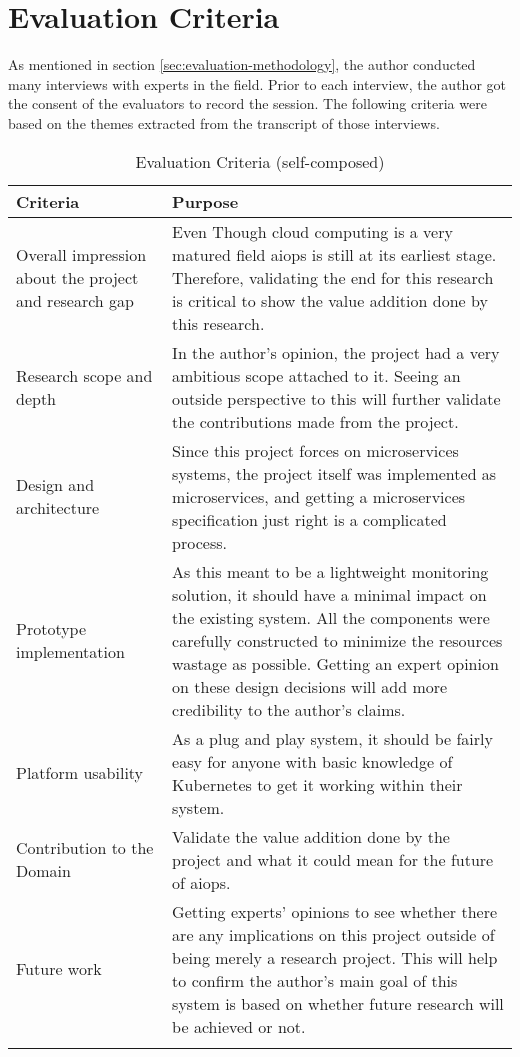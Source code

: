\section{Evaluation Criteria}

As mentioned in section \ref{sec:evaluation-methodology}, the author conducted many interviews with experts in the field. Prior to each interview, the author got the consent of the evaluators to record the session. The following criteria were based on the themes extracted from the transcript of those interviews.

\begin{longtable}{|p{33mm}|p{120mm}|}
    \hline
    \textbf{Criteria} &
    \textbf{Purpose} \\ \hline
    Overall impression about the project and research gap &
        Even Though cloud computing is a very matured field \ac{aiops} is still at its earliest stage. Therefore, validating the end for this research is critical to show the value addition done by this research. \\ \hline
    Research scope and depth &
        In the author's opinion, the project had a very ambitious scope attached to it. Seeing an outside perspective to this will further validate the contributions made from the project. \\ \hline
    Design and architecture &
        Since this project forces on microservices systems, the project itself was implemented as microservices, and getting a microservices specification just right is a complicated process. \\ \hline
    Prototype implementation &
        As this meant to be a lightweight monitoring solution, it should have a minimal impact on the existing system. All the components were carefully constructed to minimize the resources wastage as possible. Getting an expert opinion on these design decisions will add more credibility to the author's claims. \\ \hline
    Platform usability &
        As a plug and play system, it should be fairly easy for anyone with basic knowledge of Kubernetes to get it working within their system. \\ \hline
    Contribution to the Domain &
        Validate the value addition done by the project and what it could mean for the future of \ac{aiops}. \\ \hline
    Future work &
        Getting experts' opinions to see whether there are any implications on this project outside of being merely a research project. This will help to confirm the author’s main goal of this system is based on whether future research will be achieved or not. \\ \hline
  
    \caption{Evaluation Criteria (self-composed)}
\end{longtable}